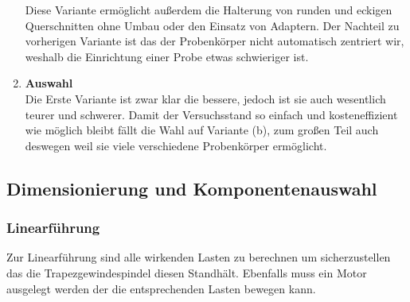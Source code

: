 \begin{enumerate}[label=(\alph*)]
Diese Variante ermöglicht außerdem die Halterung von runden und eckigen Querschnitten ohne Umbau oder den Einsatz von Adaptern. Der Nachteil zu vorherigen Variante ist das der Probenkörper nicht automatisch zentriert wir, weshalb die Einrichtung einer Probe etwas schwieriger ist.

\item \textbf{Auswahl}\\
Die Erste Variante ist zwar klar die bessere, jedoch ist sie auch wesentlich teurer und schwerer. Damit der Versuchsstand so einfach und kosteneffizient wie möglich bleibt fällt die Wahl auf Variante (b), zum großen Teil auch deswegen weil sie viele verschiedene Probenkörper ermöglicht.

\end{enumerate}


\subsection{Dimensionierung und Komponentenauswahl}

\subsubsection{Linearführung}
Zur Linearführung sind alle wirkenden Lasten zu berechnen um sicherzustellen das die Trapezgewindespindel diesen Standhält. Ebenfalls muss ein Motor ausgelegt werden der die entsprechenden Lasten bewegen kann.

